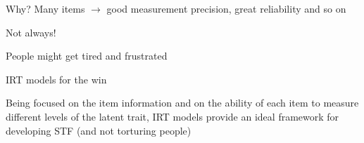 \documentclass[aspectratio=149, compress]{beamer}
\begin{document}
\begin{frame}{Why?}
	Many items $\rightarrow$ good measurement precision, great reliability and so on
	
	\begin{center}
		Not always!
	\end{center}
	
	People might get tired and frustrated 
	 
	
	\begin{block}{IRT models for the win}
		
	Being focused on the item information and on the ability of each item to measure different levels of the latent trait, IRT models provide an ideal framework for developing STF (and not torturing people)	
	\end{block}
	
\end{frame}
\end{document}
